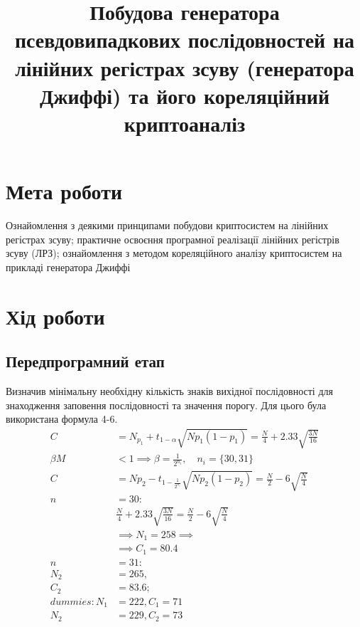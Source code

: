 \documentclass[12pt]{article}
\title{\textbf{Побудова генератора псевдовипадкових послідовностей на лінійних регістрах зсуву (генератора Джиффі) та його кореляційний криптоаналіз}}
\author{}
\date{}
\begin{document}
\maketitle

\section{Мета роботи}
\quad Ознайомлення з деякими принципами побудови криптосистем на лінійних регістрах зсуву; практичне освоєння програмної реалізації лінійних регістрів зсуву (ЛРЗ); ознайомлення з методом кореляційного аналізу криптосистем на прикладі генератора Джиффі

\section{Хід роботи}
\subsection{Передпрограмний етап}
\quad Визначив мінімальну необхідну кількість знаків вихідної послідовності для знаходження заповення послідовності та значення порогу. Для цього була використана формула 4-6.
\begin{align*}
    C &= N_{p_1} + t_{1-\alpha} \sqrt{Np_{1}(1 - p_1)} = \frac{N}{4} + 2.33 \sqrt{\frac{3N}{16}} \\
    \beta M &< 1 \implies \beta = \frac{1}{2^{n_i}}, \quad n_i = \{30, 31\} \\
    C &= Np_{2} - t_{1 - \frac{1}{2^{n_i}}} \sqrt{Np_{2}(1 - p_2)} = \frac{N}{2} - 6 \sqrt{\frac{N}{4}} \\
    n &= 30: \\
    &\frac{N}{4} + 2.33 \sqrt{\frac{3N}{16}} = \frac{N}{2} - 6 \sqrt{\frac{N}{4}} \\ 
    &\implies N_1 = 258 \implies \\
    &\implies C_1 = 80.4 \\
    n &= 31: \\
    N_2 &= 265, \\ 
    C_2 &= 83.6; \\ 
    dummies: N_1 &= 222, C_1 = 71 \\ 
    N_2 &= 229, C_2 = 73
\end{align*}
\end{document}
